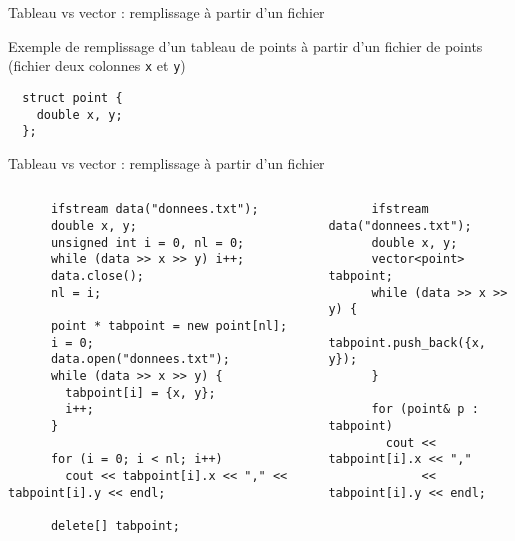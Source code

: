 \documentclass[c]{beamer}
\begin{document}

\begin{frame}[fragile,label={sec:orgheadline6}]{Tableau vs vector : remplissage à partir d'un fichier}

Exemple de remplissage d'un tableau de points à partir d'un fichier de points (fichier deux colonnes \texttt{x} et \texttt{y})
  
\begin{verbatim}
  struct point {
    double x, y;
  };
\end{verbatim}

\end{frame}

\begin{frame}[fragile,label={sec:orgheadline6}]{Tableau vs vector : remplissage à partir d'un fichier}

  \begin{columns}[t]
    \hspace{-0.8cm} 
    \begin{column}{0.6\textwidth}
      \begin{verbatim}
      ifstream data("donnees.txt");
      double x, y;
      unsigned int i = 0, nl = 0;
      while (data >> x >> y) i++;
      data.close();
      nl = i;

      point * tabpoint = new point[nl];
      i = 0;
      data.open("donnees.txt");
      while (data >> x >> y) {
        tabpoint[i] = {x, y};
        i++;
      }

      for (i = 0; i < nl; i++)
        cout << tabpoint[i].x << "," << tabpoint[i].y << endl;

      delete[] tabpoint;
      \end{verbatim}
    \end{column}
    \hspace{-0.6cm} 
    \begin{column}{0.6\textwidth}
      \begin{verbatim}
      ifstream data("donnees.txt");
      double x, y;
      vector<point> tabpoint;
      while (data >> x >> y) {
        tabpoint.push_back({x, y});
      }

      for (point& p : tabpoint)
        cout << tabpoint[i].x << ","
             << tabpoint[i].y << endl;
      \end{verbatim}
    \end{column}
  \end{columns}
\end{frame}
\end{document}
